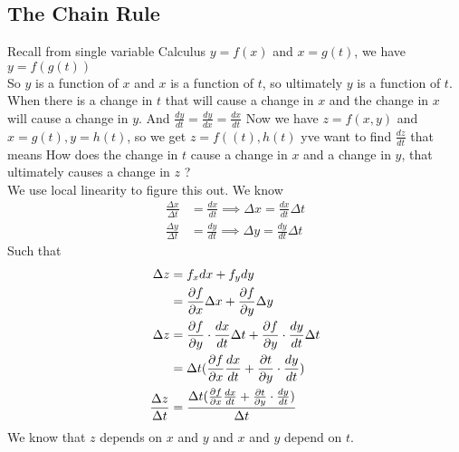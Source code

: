 \documentclass{article}
\begin{document}
\subsection{The Chain Rule}
Recall from single variable Calculus $y=f(x)$ and $x=g(t)$, we have $y=f(g(t))$
\\So $y$ is a function of $x$ and $x$ is a function of $t$, so ultimately $y$ is a function of $t$. When there is a change in $t$ that will cause a change in $x$ and the change in $x$ will cause a change in $y$.
\double
And $\frac{d y}{d t}= \frac{dy}{dx}=\frac{dx}{dt}$
\double
Now we have $z=f(x, y)$ and $x=g(t), y=h(t)$, so we get $z=f\left((t), h(t)\right.$ yve want to find $\frac{d z}{d t}$ that means How does the change in $t$ cause a change in $x$ and a change in $y$, that ultimately causes a change in $z$ ?
\\We use local linearity to figure this out.
\double We know
\begin{align*}
  \frac{\Delta x }{\Delta t} &= \frac{dx}{dt} \implies \Delta x = \frac{dx}{dt} \Delta t\\
  \frac{\Delta y}{\Delta t} &= \frac{dy}{dt} \implies \Delta y = \frac{dy}{dt} \Delta t
\end{align*}
Such that
\begin{align*}
  \Delta z &= f_x dx +f_y dy\\
  &= \frac{\partial f}{\partial x} \Delta x + \frac{\partial f}{\partial y} \Delta y \\
  \Delta z &= \frac{\partial f}{\partial y} \cdot \frac{dx}{dt} \Delta t + \frac{\partial f}{\partial y} \cdot \frac{dy}{dt} \Delta t \\
  &= \Delta t (\frac{\partial f}{\partial x} \frac{dx}{dt} + \frac{\partial t}{\partial y} \cdot \frac{dy}{dt}) \\
  \frac{\Delta z}{\Delta t} &= \dfrac{\Delta t (\frac{\partial f}{\partial x} \frac{dx}{dt} + \frac{\partial t}{\partial y} \cdot \frac{dy}{dt})}{\Delta t}
\end{align*}
\sol We know that $z$ depends on $x$ and $y$ and $x$ and $y$ depend on $t$.
\end{document}
